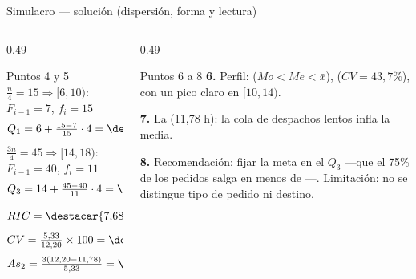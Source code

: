 \documentclass[aspectratio=169,10pt]{beamer}
\begin{document}
\begin{frame}{Simulacro — solución (dispersión, forma y lectura)}
  \scriptsize
  \begin{columns}[T,onlytextwidth]
    \begin{column}{0.49\textwidth}
      \begin{block}{Puntos 4 y 5}
        \scriptsize
        $\frac{n}{4}=15 \Rightarrow [6,10)$: $F_{i-1}=7$, $f_i=15$
        \[ Q_1 = 6+\tfrac{15-7}{15}\cdot4 = \destacar{8{,}13} \]
        $\frac{3n}{4}=45 \Rightarrow [14,18)$: $F_{i-1}=40$, $f_i=11$
        \[ Q_3 = 14+\tfrac{45-40}{11}\cdot4 = \destacar{15{,}82} \]
        \[ RIC = \destacar{7{,}68} \qquad
           s = \sqrt{\tfrac{1\,677{,}60}{59}} = \destacar{5{,}33} \]
        \[ CV = \tfrac{5{,}33}{12{,}20}\times100 = \destacar{43{,}7\%} \]
        \[ As_2 = \tfrac{3(12{,}20-11{,}78)}{5{,}33} = \destacar{0{,}238} \]
      \end{block}
    \end{column}
    \begin{column}{0.49\textwidth}
      \begin{exampleblock}{Puntos 6 a 8}
        \scriptsize
        \textbf{6.} Perfil: 
        ($Mo<Me<\bar{x}$),  ($CV=43{,}7\%$), con
        un pico claro en $[10,14)$.

        \vspace{0.1cm}
        \textbf{7.} La  (11,78 h): la cola de despachos lentos
        infla la media.

        \vspace{0.1cm}
        \textbf{8.} Recomendación: fijar la meta en el $Q_3$ —que el 75\% de
        los pedidos salga en menos de —. Limitación: no se
        distingue tipo de pedido ni destino.
      \end{exampleblock}
    \end{column}
  \end{columns}
\end{frame}
\end{document}

